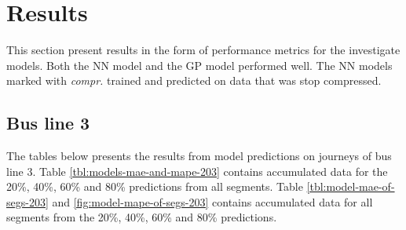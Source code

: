 
\captionsetup{width=.75\textwidth}


\chapter{Results}
\label{cha:results}
This section present results in the form of performance metrics for the investigate models. Both the NN model and the GP model performed well. The NN models marked with \emph{compr.} trained and predicted on data that was stop compressed.

\section{Bus line 3}
The tables below presents the results from model predictions on journeys of bus line 3. Table \ref{tbl:models-mae-and-mape-203} contains accumulated data for the 20\%, 40\%, 60\% and 80\% predictions from all segments. Table \ref{tbl:model-mae-of-segs-203} and \ref{fig:model-mape-of-segs-203} contains accumulated data for all segments from the 20\%, 40\%, 60\% and 80\% predictions.
 
